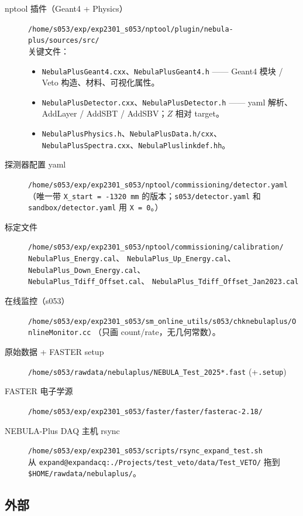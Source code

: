 \documentclass[a4paper,11pt]{ctexart}
\newcommand{\NPL}{NEBULA-Plus}
\begin{document}
\begin{description}
  \item[nptool 插件（Geant4 + Physics）]
    \texttt{/home/s053/exp/exp2301\_s053/nptool/plugin/nebula-plus/sources/src/} \\
    关键文件：
    \begin{itemize}
      \item \texttt{NebulaPlusGeant4.cxx}、\texttt{NebulaPlusGeant4.h}
            —— Geant4 模块 / Veto 构造、材料、可视化属性。
      \item \texttt{NebulaPlusDetector.cxx}、\texttt{NebulaPlusDetector.h}
            —— yaml 解析、AddLayer / AddSBT / AddSBV；$Z$ 相对 target。
      \item \texttt{NebulaPlusPhysics.h}、\texttt{NebulaPlusData.h/cxx}、
            \texttt{NebulaPlusSpectra.cxx}、\texttt{NebulaPluslinkdef.hh}。
    \end{itemize}
  \item[探测器配置 yaml]
    \texttt{/home/s053/exp/exp2301\_s053/nptool/commissioning/detector.yaml}
    （唯一带 \texttt{X\_start = -1320\,mm} 的版本；\texttt{s053/detector.yaml}
    和 \texttt{sandbox/detector.yaml} 用 \texttt{X = 0}。）
  \item[标定文件]
    \texttt{/home/s053/exp/exp2301\_s053/nptool/commissioning/calibration/}\\
    \quad \texttt{NebulaPlus\_Energy.cal}、
    \texttt{NebulaPlus\_Up\_Energy.cal}、
    \texttt{NebulaPlus\_Down\_Energy.cal}、\\
    \quad \texttt{NebulaPlus\_Tdiff\_Offset.cal}、
    \texttt{NebulaPlus\_Tdiff\_Offset\_Jan2023.cal}
  \item[在线监控（s053）]
    \texttt{/home/s053/exp/exp2301\_s053/sm\_online\_utils/s053/chknebulaplus/OnlineMonitor.cc}
    （只画 count/rate，无几何常数）。
  \item[原始数据 + FASTER setup]
    \texttt{/home/s053/rawdata/nebulaplus/NEBULA\_Test\_2025*.fast}
    (+\texttt{.setup})
  \item[FASTER 电子学源]
    \texttt{/home/s053/exp/exp2301\_s053/faster/faster/fasterac-2.18/}
  \item[\NPL{} DAQ 主机 rsync]
    \texttt{/home/s053/exp/exp2301\_s053/scripts/rsync\_expand\_test.sh}
    \\ 从 \texttt{expand@expandacq:./Projects/test\_veto/data/Test\_VETO/}
    拖到 \texttt{\$HOME/rawdata/nebulaplus/}。
\end{description}

\subsection{外部}
\end{document}
